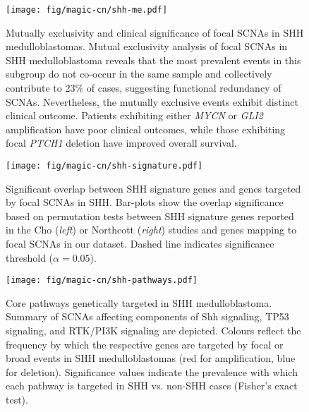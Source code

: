 \documentclass[11pt,letterpaper]{article}
\theoremstyle{definition}
\begin{document}
\clearpage

\begin{figure}
	\centering
	\texttt{[image: fig/magic-cn/shh-me.pdf]}
	\caption[Mutually exclusivity and clinical significance of focal SCNAs in SHH medulloblastomas]
	{
	Mutually exclusivity and clinical significance of focal SCNAs in SHH medulloblastomas.
	Mutual exclusivity analysis of focal SCNAs in SHH medulloblastoma reveals that the most prevalent events in this subgroup do not co-occur in the same sample and collectively contribute to 23\% of cases, suggesting functional redundancy of SCNAs. Nevertheless, the mutually exclusive events exhibit distinct clinical outcome. Patients exhibiting either \emph{MYCN} or \emph{GLI2} amplification have poor clinical outcomes, while those exhibiting focal \emph{PTCH1} deletion have improved overall survival.
	}
	\label{fig:shh-me}
\end{figure}

\begin{SCfigure}[5]
	\centering
	\texttt{[image: fig/magic-cn/shh-signature.pdf]}
	\caption[Overlap between SHH signature genes and genes targeted by focal SCNAs in SHH]
	{
	Significant overlap between SHH signature genes and genes targeted by focal SCNAs in SHH.
	Bar-plots show the overlap significance based on permutation tests between SHH signature genes reported in the Cho (\emph{left}) or Northcott (\emph{right}) studies and genes mapping to focal SCNAs in our dataset. Dashed line indicates significance threshold ($\alpha = 0.05$).
	}
	\label{fig:shh-signature}
\end{SCfigure}

\clearpage

\begin{figure}[h]
	\begin{center}
		\texttt{[image: fig/magic-cn/shh-pathways.pdf]}
	\end{center}
	\caption[Core pathways genetically targeted in SHH medulloblastoma]
	{
	Core pathways genetically targeted in SHH medulloblastoma.
	Summary of SCNAs affecting components of Shh signaling, TP53 signaling, and RTK/PI3K signaling are depicted. Colours reflect the frequency by which the respective genes are targeted by focal or broad events in SHH medulloblastomas (red for amplification, blue for deletion). Significance values indicate the prevalence with which each pathway is targeted in SHH vs. non-SHH cases (Fisher's exact test).
	}
	\label{fig:shh-pathways}
\end{figure}
\end{document}
